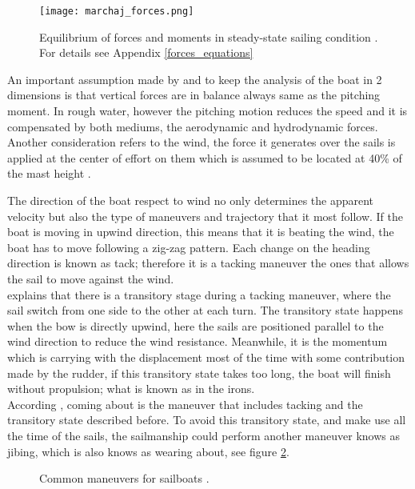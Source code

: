  \begin{figure}[ht]
\centering
  \texttt{[image: marchaj\_forces.png]}
 \caption{Equilibrium of forces and moments in steady-state sailing condition \cite{marchajaereo1979}. For details see Appendix \ref{forces_equations} }
\label{forces_m}
\end{figure}

An important assumption made by  \cite{philpott1993yacht} and \cite{larsonprinciples} to keep the analysis of the boat in 2 dimensions is that vertical forces are in balance always same as the pitching moment. In rough water, however the pitching motion reduces the speed and it is compensated by both mediums, the aerodynamic and hydrodynamic forces. Another consideration refers to the wind, the force it generates over the sails is applied at  the center of effort on them which is assumed to be located at 40\% of the mast height \cite{philpott1993yacht}. \par

The direction of the boat respect to wind no only determines the apparent velocity but also the type of maneuvers and trajectory that it most follow. If the boat is moving in upwind direction, this means that it is beating the wind, the boat has to move following a zig-zag pattern.  Each change on the heading direction is known as tack; therefore it is a tacking maneuver the ones that allows the sail to move against the wind. \\ \cite{denny2009float} explains that there is a transitory stage during a tacking maneuver, where the sail switch from one side to the other at each turn.  The transitory state happens when the bow is directly upwind, here the sails are positioned parallel to the wind direction to reduce the wind resistance. Meanwhile, it is the momentum which is carrying with the displacement most of the time with some contribution made by the rudder, if this transitory state takes too long, the boat will finish without propulsion; what is known as in the irons. \\According \cite{denny2009float}, coming about is the maneuver that includes tacking and the transitory state described before.  To avoid this transitory state, and make use all the time of the sails, the sailmanship could perform another maneuver knows as jibing, which is also knows as wearing about, see figure \ref{manoeuvers}.\par 

\begin{figure}[ht]
  \centering
  \hfill
   \centering
  \caption{Common maneuvers for sailboats \cite{denny2009float}.}
\label{manoeuvers} 
\end{figure}

